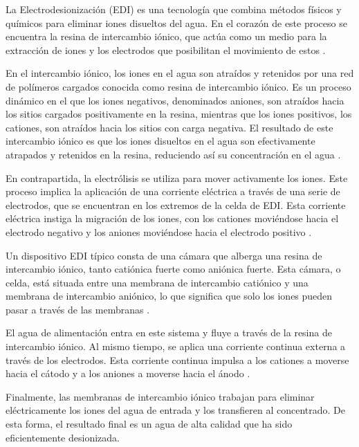 La Electrodesionización (EDI) es una tecnología que combina métodos físicos y químicos para eliminar iones disueltos
del agua. En el corazón de este proceso se encuentra la resina de intercambio iónico, que actúa como un medio para la
extracción de iones y los electrodos que posibilitan el movimiento de estos \cite{condorchemUltrapureWaterElectrodeionization2019}.

En el intercambio iónico, los iones en el agua son atraídos y retenidos por una red de polímeros
cargados conocida como resina de intercambio iónico. Es un proceso dinámico en el que los iones negativos,
denominados aniones, son atraídos hacia los sitios cargados positivamente en la resina, mientras
que los iones positivos, los cationes, son atraídos hacia los sitios con carga negativa.
El resultado de este intercambio iónico es que los iones disueltos en el agua son efectivamente
atrapados y retenidos en la resina, reduciendo así su concentración en el agua \cite{lenntechElectrodeionizationEDI} \cite{condorchemUltrapureWaterElectrodeionization2019}.

En contrapartida, la electrólisis se utiliza para mover activamente los iones. Este proceso
implica la aplicación de una corriente eléctrica a través de una serie de electrodos, que se
encuentran en los extremos de la celda de EDI. Esta corriente eléctrica instiga la migración
de los iones, con los cationes moviéndose hacia el electrodo negativo y los aniones moviéndose
hacia el electrodo positivo \cite{condorchemUltrapureWaterElectrodeionization2019}.

Un dispositivo EDI típico consta de una cámara que alberga una resina de intercambio iónico,
tanto catiónica fuerte como aniónica fuerte. Esta cámara, o celda, está situada entre una membrana
de intercambio catiónico y una membrana de intercambio aniónico, lo que significa que solo
los iones pueden pasar a través de las membranas \cite{alvaradoElectrodeionizationPrinciplesStrategies2014}.

El agua de alimentación entra en este sistema y fluye a través de la resina de intercambio
iónico. Al mismo tiempo, se aplica una corriente continua externa a través de los electrodos.
Esta corriente continua impulsa a los cationes a moverse hacia el cátodo y a los aniones a
moverse hacia el ánodo \cite{alvaradoElectrodeionizationPrinciplesStrategies2014}.

Finalmente, las membranas de intercambio iónico trabajan para eliminar eléctricamente los iones del
agua de entrada y los transfieren al concentrado. De esta forma, el resultado final es un agua
de alta calidad que ha sido eficientemente desionizada.

